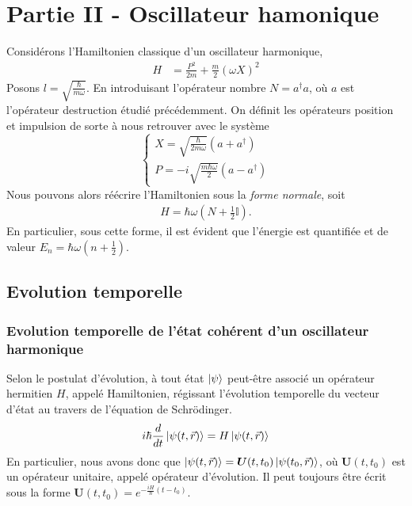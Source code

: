 \documentclass[11pt,oneside,a4paper]{article}
\newcommand{\h}{\ensuremath{\hbar}}
\begin{document}
\section{Partie II - Oscillateur hamonique}
\label{part 2}
Considérons l'Hamiltonien classique d'un oscillateur harmonique, 
\begin{align}
  \label{Hamiltonien OH}
  H &= \frac{P^2}{2m} + \frac{m}{2}\left(\omega X\right)^2
\end{align}
Posons $l = \sqrt{\frac{\h}{m\omega}}$. En introduisant l'opérateur nombre $N = a^\dagger a$, où $a$ est l'opérateur destruction étudié précédemment. On définit les opérateurs position et impulsion de sorte à nous retrouver avec le système
\begin{equation}
  \begin{cases}
    X = \sqrt{\frac{\h}{2m\omega}}\left(a+a^\dagger\right)\\
    P = -i\sqrt{\frac{m\h\omega}{2}}\left(a-a^\dagger\right)
  \end{cases}
  \label{P and X}
\end{equation}
Nous pouvons alors réécrire l'Hamiltonien sous la \emph{forme normale}, soit 
\begin{align}
  \label{Hamiltonien OH normale}
  H = \h\omega\left(N+\frac{1}{2}\mathbb{I}\right).
\end{align}
En particulier, sous cette forme, il est évident que l'énergie est quantifiée et de valeur $E_n = \h\omega\left(n+\frac{1}{2}\right)$.
\subsection{Evolution temporelle}
\subsubsection{Evolution temporelle de l'état cohérent d'un oscillateur harmonique}
Selon le postulat d'évolution, à tout état $\ket{\psi}$ peut-être associé un opérateur hermitien $H$, appelé Hamiltonien, régissant l'évolution temporelle du vecteur d'état au travers de l'équation de Schrödinger.
\begin{equation}
  i\h\frac{d}{dt}\ket{\psi(t,\vec{r})} = H\ket{\psi (t,\vec{r})}
\end{equation}
En particulier, nous avons donc que $\ket{\psi(t,\vec{r})} = \bm{U}(t,t_0)\ket{\psi(t_0,\vec{r})}$, où $\bm{U}(t,t_0)$ est un opérateur unitaire, appelé opérateur d'évolution. Il peut toujours être écrit sous la forme $\bm{U}(t,t_0) = e^{-\frac{iH}{\h}(t-t_0)}$.\\
\end{document}
